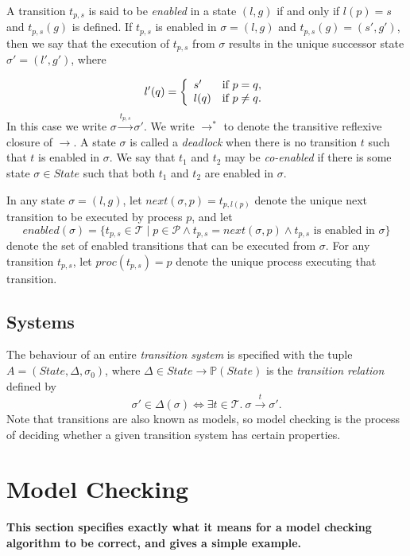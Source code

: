 \documentclass[12pt,a4paper,twoside,openright]{report}
\begin{document}
A transition $t_{p,s}$ is said to be \emph{enabled} in a state
$(l, g)$ if and only if $l(p) = s$ and $t_{p,s}(g)$ is defined.
If $t_{p,s}$ is enabled in $\sigma = (l, g)$ and 
$t_{p,s}(g) = (s', g')$, then we say that the
execution of $t_{p,s}$ from $\sigma$ results in the unique successor
state $\sigma' = (l', g')$, where

\[
	l'(q) = \left\{\begin{array}{lr}
				s' & \textmd{if } p = q, \\
				l(q) &\textmd{if } p \neq q.
			\end{array} \right.
\]
In this case we write $\sigma \xrightarrow{t_{p,s}} \sigma'$.
We write $\longrightarrow^*$ to denote the transitive reflexive
closure of $\longrightarrow$.
A state $\sigma$ is called a \emph{deadlock} when there is no transition
$t$ such that $t$ is enabled in $\sigma$. We say that $t_1$ and $t_2$
may be \emph{co-enabled} if there is some state $\sigma \in \textit{State}$
such that both $t_1$ and $t_2$ are enabled in $\sigma$.

In any state $\sigma = (l, g)$, let
$\textit{next}(\sigma, p) = t_{p,l(p)}$ denote the unique next transition
to be executed by process $p$, and let
\[
	\textit{enabled}(\sigma) = \{t_{p,s} \in \mathcal{T} \mid
	p \in \mathcal{P} \wedge t_{p,s} = \textit{next}(\sigma, p)
	\wedge t_{p,s} \text{ is enabled in } \sigma\}
\]
denote the set of enabled transitions that can be executed from $\sigma$.
For any transition $t_{p,s}$, let $\textit{proc}(t_{p,s}) = p$
denote the unique process executing that transition.

\subsection{Systems}
The behaviour of an entire \emph{transition system} is
specified with the tuple $A = (\textit{State}, \Delta, \sigma_0)$,
where $\Delta \in State \to \mathbb{P}(State)$
is the \emph{transition relation} defined by
\[
	\sigma' \in \Delta(\sigma) \iff
	\exists t \in \mathcal{T}. \ \sigma \xrightarrow{t} \sigma'.
\]
Note that transitions are also known as models,
so model checking is the process of deciding
whether a given transition system has certain
properties.

\section{Model Checking}
\textbf{This section specifies exactly what it
	means for a model checking algorithm to be
	correct, and gives a simple example.}
\end{document}
